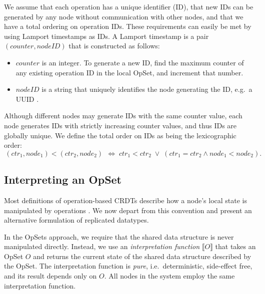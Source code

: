 We assume that each operation has a unique identifier (ID), that new IDs can be generated by any node without communication with other nodes, and that we have a total ordering on operation IDs.
These requirements can easily be met by using Lamport timestamps \cite{Lamport:1978jq} as IDs.
A Lamport timestamp is a pair $(\mathit{counter}, \mathit{nodeID})$ that is constructed as follows:
\begin{itemize}
\item $\mathit{counter}$ is an integer.
    To generate a new ID, find the maximum counter of any existing operation ID in the local OpSet, and increment that number.
\item $\mathit{nodeID}$ is a string that uniquely identifies the node generating the ID, e.g.\ a UUID \cite{Leach:2005hm}.
\end{itemize}

Although different nodes may generate IDs with the same counter value, each node generates IDs with strictly increasing counter values, and thus IDs are globally unique.
We define the total order on IDs as being the lexicographic order:
\[
    \,(\mathit{ctr}_1, \mathit{node}_1) < (\mathit{ctr}_2, \mathit{node}_2)\,
    \;\Longleftrightarrow\;
    \mathit{ctr}_1 < \mathit{ctr}_2 \;\vee\;
    (\mathit{ctr}_1 = \mathit{ctr}_2 \wedge \mathit{node}_1 <\mathit{node}_2).
\]


\subsection{Interpreting an OpSet}\label{sec:op-serial}

Most definitions of operation-based CRDTs describe how a node's local state is manipulated by operations \cite{Shapiro:2011wy,Shapiro:2011un}.
We now depart from this convention and present an alternative formulation of replicated datatypes.

In the OpSets approach, we require that the shared data structure is never manipulated directly.
Instead, we use an \emph{interpretation function} $\llbracket O \rrbracket$ that takes an OpSet $O$ and returns the current state of the shared data structure described by the OpSet.
The interpretation function is \emph{pure}, i.e.\ deterministic, side-effect free, and its result depends only on $O$.
All nodes in the system employ the same interpretation function.

